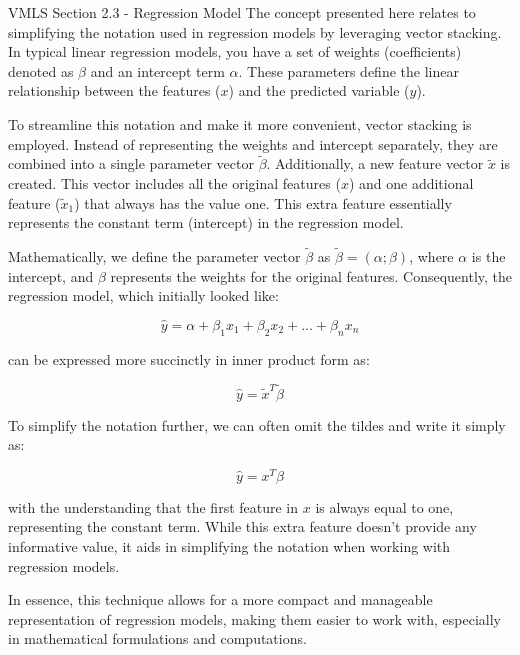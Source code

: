 \begin{notes}{VMLS Section 2.3 - Regression Model}
    The concept presented here relates to simplifying the notation used in regression models by leveraging vector stacking. In typical linear regression models, you have a set of weights (coefficients) denoted as \( \beta \) and an intercept term \( \alpha \). 
    These parameters define the linear relationship between the features (\( x \)) and the predicted variable (\( y \)).
    
    To streamline this notation and make it more convenient, vector stacking is employed. Instead of representing the weights and intercept separately, they are combined into a single parameter vector \( \tilde{\beta} \). Additionally, a new feature vector 
    \( \tilde{x} \) is created. This vector includes all the original features (\( x \)) and one additional feature (\( \tilde{x}_1 \)) that always has the value one. This extra feature essentially represents the constant term (intercept) in the regression model.
    
    Mathematically, we define the parameter vector \( \tilde{\beta} \) as \( \tilde{\beta} = (\alpha; \beta) \), where \( \alpha \) is the intercept, and \( \beta \) represents the weights for the original features. Consequently, the regression model, which 
    initially looked like:
    
    \[
    \hat{y} = \alpha + \beta_1x_1 + \beta_2x_2 + \ldots + \beta_nx_n
    \]
    
    can be expressed more succinctly in inner product form as:
    
    \[
    \hat{y} = \tilde{x}^T \tilde{\beta}
    \]
    
    To simplify the notation further, we can often omit the tildes and write it simply as:
    
    \[
    \hat{y} = x^T \beta
    \]
    
    with the understanding that the first feature in \( x \) is always equal to one, representing the constant term. While this extra feature doesn't provide any informative value, it aids in simplifying the notation when working with regression models.
    
    In essence, this technique allows for a more compact and manageable representation of regression models, making them easier to work with, especially in mathematical formulations and computations.    
    
\end{notes}